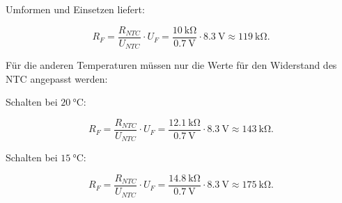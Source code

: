 \documentclass[ngerman, 11pt]{scrreprt}
\begin{document}
	Umformen und Einsetzen liefert:
	
	\begin{equation*}
		R_F = \frac{R_{NTC}}{U_{NTC}} \cdot U_F = \frac{\SI{10}{\kilo\ohm}}{\SI{0,7}{\volt}} \cdot \SI{8,3}{\volt} \approx \SI{119}{\kilo\ohm}.
	\end{equation*}
	
	\newpage
	Für die anderen Temperaturen müssen nur die Werte für den Widerstand des NTC angepasst werden:
	
	Schalten bei $\SI{20}{\celsius}$:
	
	\begin{equation*}
	R_F = \frac{R_{NTC}}{U_{NTC}} \cdot U_F = \frac{\SI{12,1}{\kilo\ohm}}{\SI{0,7}{\volt}} \cdot \SI{8,3}{\volt} \approx \SI{143}{\kilo\ohm}.
	\end{equation*}
	
	Schalten bei $\SI{15}{\celsius}$:
	
	\begin{equation*}
	R_F = \frac{R_{NTC}}{U_{NTC}} \cdot U_F = \frac{\SI{14,8}{\kilo\ohm}}{\SI{0,7}{\volt}} \cdot \SI{8,3}{\volt} \approx \SI{175}{\kilo\ohm}.
	\end{equation*}
	
\end{document}
